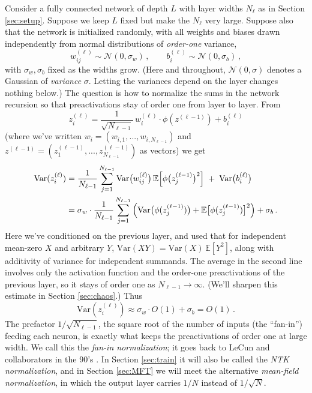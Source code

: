 \documentclass[11pt]{article}
\newcommand{\E}{\mathbb{E}}
\newcommand{\CN}{{\mathcal N}}
\begin{document}
Consider a fully connected network of depth $L$ with layer widths $N_\ell$ as in Section \ref{sec:setup}. Suppose we keep $L$ fixed but make the $N_\ell$ very large. Suppose also that the network is initialized randomly, with all weights and biases drawn independently from normal distributions of \emph{order-one} variance,
%
\begin{equation} \label{init-O1}
    w_{ij}^{(\ell)} \sim \CN(0,\sigma_w)\,,\qquad b_i^{(\ell)}\sim \CN(0,\sigma_b)\,,
\end{equation}
%
with $\sigma_w,\sigma_b$ fixed as the widths grow. (Here and throughout, $\CN(0,\sigma)$ denotes a Gaussian of \emph{variance} $\sigma$. Letting the variances depend on the layer changes nothing below.) The question is how to normalize the sums in the network recursion so that preactivations stay of order one from layer to layer. From
%
\begin{equation}
   z_i^{(\ell)} = \frac{1}{\sqrt{N_{\ell-1}}}\, w_i^{(\ell)} \cdot \phi(z^{(\ell-1)}) + b_i^{(\ell)}
\end{equation}
%
(where we've written $w_i=(w_{i,1},...,w_{i,N_{\ell-1}})$ and $z^{(\ell-1)} = (z^{(\ell-1)}_1,...,z^{(\ell-1)}_{N_{\ell-1}})$ as vectors) we get
%
\begin{align}
    \text{Var}(z_i^{(\ell)}) &= \frac{1}{N_{\ell-1}}\sum_{j=1}^{N_{\ell-1}} \text{Var}\big(w_{ij}^{(\ell)}\big)\, \E\Big[\phi\big(z_j^{(\ell-1)}\big)^2\Big] \;+\; \text{Var}\big(b_i^{(\ell)}\big) \notag \\
    &= \sigma_w \cdot \frac{1}{N_{\ell-1}}\sum_{j=1}^{N_{\ell-1}}\Big( \text{Var}\big(\phi(z_j^{(\ell-1)})\big)+\E\big[\phi(z_j^{(\ell-1)})\big]^2\Big) +\sigma_b\,.
\end{align}
%
Here we've conditioned on the previous layer, and used that for independent mean-zero $X$ and arbitrary $Y$, $\text{Var}(XY) = \text{Var}(X)\,\E[Y^2]$, along with additivity of variance for independent summands. The average in the second line involves only the activation function and the order-one preactivations of the previous layer, so it stays of order one as $N_{\ell-1}\to\infty$. (We'll sharpen this estimate in Section \ref{sec:chaos}.) Thus
%
\begin{equation} \label{fanin}
    \text{Var}(z_i^{(\ell)}) \approx \sigma_w\cdot O(1) + \sigma_b = O(1)\,.
\end{equation}
%
The prefactor $1/\sqrt{N_{\ell-1}}$, the square root of the number of inputs (the ``fan-in'') feeding each neuron, is exactly what keeps the preactivations of order one at large width. We call this the \emph{fan-in normalization}; it goes back to LeCun and collaborators in the 90's \cite{lecun1998efficient}. In Section \ref{sec:train} it will also be called the \emph{NTK normalization}, and in Section \ref{sec:MFT} we will meet the alternative \emph{mean-field normalization}, in which the output layer carries $1/N$ instead of $1/\sqrt N$.
\end{document}
